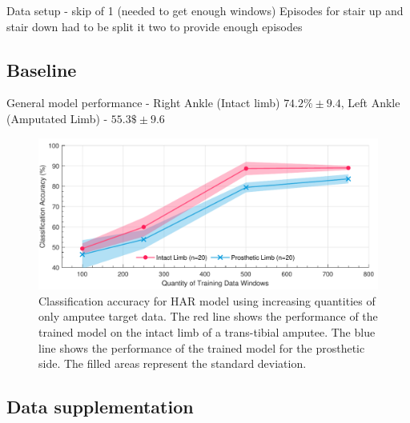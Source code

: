Data setup - skip of 1 (needed to get enough windows)
Episodes for stair up and stair down had to be split it two to provide enough episodes


\subsection{Baseline}

General model performance - Right Ankle (Intact limb) $74.2\%\pm9.4$, Left Ankle (Amputated Limb) - $55.3\$\pm9.6$ 

\begin{figure}[hbt]
    \centering
    \includegraphics[width=\textwidth]{content/6-Amputee/ch6_baseline_model_accuracy.pdf}
    \caption[Classification accuracy for HAR model using increasing quantities of only amputee target data]{Classification accuracy for HAR model using increasing quantities of only amputee target data. The red line shows the performance of the trained model on the intact limb of a trans-tibial amputee. The blue line shows the performance of the trained model for the prosthetic side. The filled areas represent the standard deviation.}
    \label{fig:ch6-amputee-retrain-pre-trained}
\end{figure}


\subsection{Data supplementation}


